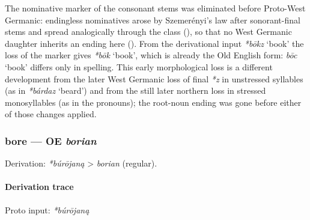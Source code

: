 \documentclass[
  british,
  a4paper,
]{article}
\providecommand{\Recon}[1]{\emph{*#1}}
\begin{document}
The nominative marker of the consonant stems was eliminated before
Proto-West Germanic: endingless nominatives arose by Szemerényi's law
after sonorant-final stems and spread analogically through the class
(), so that no West Germanic
daughter inherits an ending here (). From the derivational input \Recon{bōkz} `book'
the loss of the marker gives \Recon{bōk} `book', which is already the
Old English form: \emph{bōc} `book' differs only in spelling. This early
morphological loss is a different development from the later West
Germanic loss of final \emph{*z} in unstressed syllables (as in
\Recon{bárdaz} `beard') and from the still later northern loss in
stressed monosyllables (as in the pronouns); the root-noun ending was
gone before either of those changes applied.

\subsubsection{\texorpdfstring{bore --- OE
\emph{borian}}{bore --- OE borian}}\label{bore-oe-borian}

Derivation: \emph{*búrōjaną} \textgreater{} \emph{borian} (regular).

\paragraph{Derivation trace}\label{derivation-trace-9}

Proto input: \emph{*búrōjaną}

\begingroup
\setlength{\fboxsep}{6pt}
\end{document}
